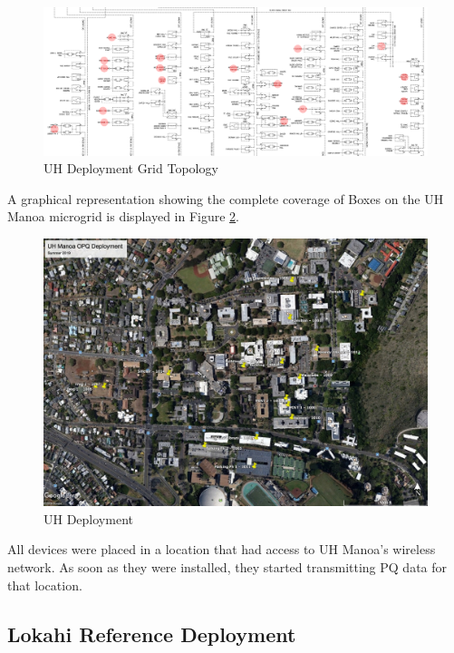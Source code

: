 \begin{figure}
	\centering
	\includegraphics[width=\linewidth]{figures/uh_thesis_depoyment_v1.png}
	\caption{UH Deployment Grid Topology}
	\label{fig:UhGridTopo}
\end{figure}

A graphical representation showing the complete coverage of Boxes on the UH Manoa microgrid is displayed in Figure \ref{fig:UhDeploy}.

\begin{figure}
	\centering
	\includegraphics[width=\linewidth]{figures/deploy.jpg}
	\caption{UH Deployment}
	\label{fig:UhDeploy}
\end{figure}

All devices were placed in a location that had access to UH Manoa's wireless network. As soon as they were installed, they started transmitting PQ data for that location.

\subsection{Lokahi Reference Deployment}\label{subsec:lokahi-reference-deployment}

